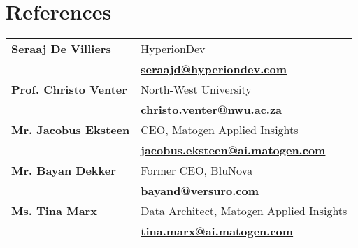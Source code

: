 \documentclass[a4paper,10pt]{article}
\begin{document}
\section*{References}
	\begin{tabularx}{\textwidth}{l X}
	\textbf{Seraaj De Villiers} & HyperionDev \\
	& \faEnvelope \quad \href{mailto:seraajd@hyperiondev.com}{\textbf{seraajd@hyperiondev.com}} \\[0.1cm]
	
	\textbf{Prof. Christo Venter} & North-West University \\
	& \faEnvelope \quad \href{mailto:christo.venter@nwu.ac.za}{\textbf{christo.venter@nwu.ac.za}} \\[0.1cm]
	
	\textbf{Mr. Jacobus Eksteen} & CEO, Matogen Applied Insights \\
	& \faEnvelope \quad \href{mailto:jacobus.eksteen@ai.matogen.com}{\textbf{jacobus.eksteen@ai.matogen.com}} \\[0.1cm]
	
	\textbf{Mr. Bayan Dekker} & Former CEO, BluNova\\
	& \faEnvelope \quad \href{mailto:bayand@versuro.com}{\textbf{bayand@versuro.com}} \\[0.1cm]
	
	\textbf{Ms. Tina Marx} & Data Architect, Matogen Applied Insights\\
	& \faEnvelope \quad \href{mailto:tina.marx@ai.matogen.com}{\textbf{tina.marx@ai.matogen.com}} \\[0.1cm]
\end{tabularx}
	
\end{document}
